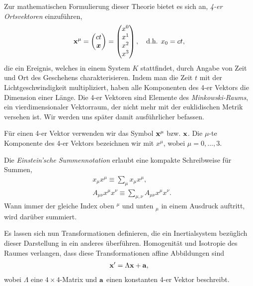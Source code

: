 Zur mathematischen Formulierung dieser Theorie bietet es sich an, \emph{4-er
Ortsvektoren} einzuführen,
\begin{align*}
\bm{\mathrm{x}}^\mu =
\begin{pmatrix}
ct\\\bm{x}              
\end{pmatrix} = 
\begin{pmatrix}
x^0 \\ x^1 \\ x^2 \\ x^3
\end{pmatrix},\quad \text{d.h. } x_0 = ct,
\end{align*}
die ein Ereignis, welches in einem System $K$ stattfindet, durch Angabe von
Zeit und Ort des Geschehens charakterisieren. Indem man die Zeit $t$ mit
der Lichtgeschwindigkeit multipliziert, haben alle Komponenten des 4-er Vektors
die Dimension einer Länge. Die 4-er Vektoren sind Elemente des
\emph{Minkowski-Raums}, ein vierdimensionaler Vektorraum, der nicht mehr mit
der euklidischen Metrik versehen ist. Wir werden uns später damit ausführlicher
befassen.

\begin{bemn}
Für einen 4-er Vektor verwenden wir das Symbol $\bm{\mathrm{x}}^\mu$ bzw.
$\bm{\mathrm{x}}$. Die $\mu$-te Komponente des 4-er Vektors bezeichnen wir mit
$x^\mu$, wobei $\mu=0,\ldots,3$.

Die \emph{Einstein'sche Summennotation} erlaubt eine kompakte Schreibweise für
Summen,
\begin{align*}
&x_\mu x^\mu\equiv\sum_\mu x_\mu x^\mu,\\
&A_{\mu\nu} x^\mu x^\nu\equiv\sum_{\mu,\nu} A_{\mu\nu} x^\mu x^\nu. 
\end{align*}
Wann immer der gleiche Index oben ${}^\mu$ und unten ${}_\mu$ in einem Ausdruck
auftritt, wird darüber summiert.\maphere
\end{bemn}
Es lassen sich nun Transformationen definieren, die ein Inertialsystem
bezüglich dieser Darstellung in ein anderes überführen. Homogenität und
Isotropie des Raumes verlangen, dass diese Transformationen affine Abbildungen
sind
\begin{align*}
\bm{\mathrm{x}}' = \Lambda \bm{\mathrm{x}} + \bm{\mathrm{a}},
\end{align*}
wobei $\Lambda$ eine $4\times 4$-Matrix und $\bm{\mathrm{a}}$ einen konstanten 4-er
Vektor beschreibt.

